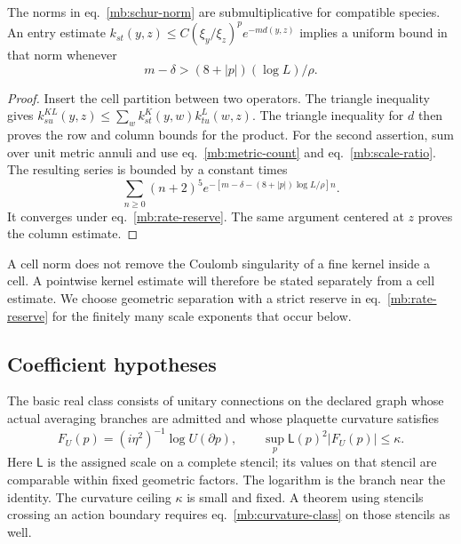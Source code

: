 \documentclass[11pt,letterpaper,reqno]{amsart}
\makeatletter
\numberwithin{equation}{section}
\renewcommand{\eqref}[1]{\textup{eq.~\ref{#1}}}
\theoremstyle{definition}
\newcommand{\ms@minorstart}{%
  \pushQED{\qed}\renewcommand{\qedsymbol}{$\blacksquare$}}
\newenvironment{lemma}[1][]{\ms@minorstart\ms@lemma[#1]}
  {\popQED\endms@lemma}
\theoremstyle{remark}
\makeatother
\begin{document}
\begin{lemma}[Weighted composition]\label{mb:weighted-composition}
The norms in \eqref{mb:schur-norm} are submultiplicative for
compatible species. An entry estimate
$k_{st}(y,z)\le C(\xi_y/\xi_z)^p e^{-m d(y,z)}$ implies a
uniform bound in that norm whenever
\begin{equation}\label{mb:rate-reserve}
                    m-\delta>(8+|p|)(\log L)/\rho.
\end{equation}
\end{lemma}
\begin{proof}
Insert the cell partition between two operators. The triangle
inequality gives $k_{su}^{KL}(y,z)\le\sum_w
k_{st}^K(y,w)k_{tu}^L(w,z)$. The triangle inequality for $d$
then proves the row and column bounds for the product.
For the second assertion, sum over unit metric annuli and use
\eqref{mb:metric-count} and \eqref{mb:scale-ratio}. The resulting
series is bounded by a constant times
\[
 \sum_{n\ge0}(n+2)^5
       e^{-[m-\delta-(8+|p|)\log L/\rho]n}.
\]
It converges under \eqref{mb:rate-reserve}. The same argument
centered at $z$ proves the column estimate.
\end{proof}

A cell norm does not remove the Coulomb singularity of a fine
kernel inside a cell. A pointwise kernel estimate will therefore
be stated separately from a cell estimate. We choose geometric
separation with a strict reserve in \eqref{mb:rate-reserve} for
the finitely many scale exponents that occur below.

\subsection{Coefficient hypotheses}

The basic real class consists of unitary connections on the
declared graph whose actual averaging branches are admitted and
whose plaquette curvature satisfies
\begin{equation}\label{mb:curvature-class}
 F_U(p)=(i\eta^2)^{-1}\log U(\partial p),\qquad
        \sup_p\mathsf L(p)^2|F_U(p)|\le\kappa.
\end{equation}
Here $\mathsf L$ is the assigned scale on a complete stencil;
its values on that stencil are comparable within fixed geometric
factors. The logarithm is the branch near the identity. The
curvature ceiling $\kappa$ is small and fixed. A theorem using
stencils crossing an action boundary requires
\eqref{mb:curvature-class} on those stencils as well.
\end{document}
